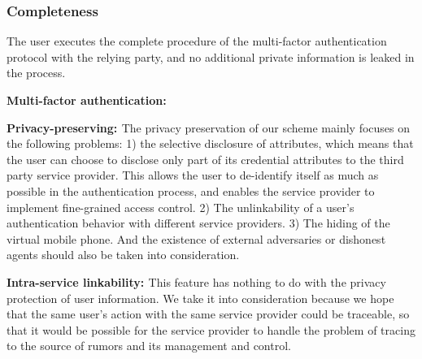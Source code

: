 \subsubsection{Completeness}
The user executes the complete procedure of the multi-factor authentication protocol with the relying party, and no additional private information is leaked in the process.
\begin{list}{}{}
    \item{\bf{Multi-factor authentication: }}
    \item{\bf{Privacy-preserving: }}The privacy preservation of our scheme mainly focuses on the following problems: 1) the selective disclosure of attributes, which means that the user can choose to disclose only part of its credential attributes to the third party service provider. This allows the user to de-identify itself as much as possible in the authentication process, and enables the service provider to implement fine-grained access control. 2) The unlinkability of a user's authentication behavior with different service providers. 3) The hiding of the virtual mobile phone. And the existence of external adversaries or dishonest agents should also be taken into consideration.\\
    \item{\bf{Intra-service linkability: }}This feature has nothing to do with the privacy protection of user information. We take it into consideration because we hope that the same user's action with the same service provider could be traceable, so that it would be possible for the service provider to handle the problem of tracing to the source of rumors and its management and control.\\
\end{list}
